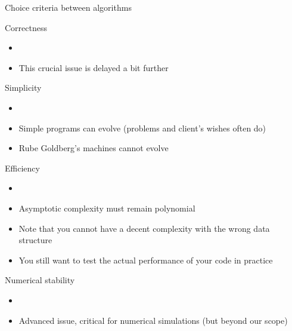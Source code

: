 \begin{frame}[squeeze]{Choice criteria between algorithms}
  \begin{block}{\alert{Correctness}}
    \begin{itemize}
    \item {}
    \item This crucial issue is delayed a bit further
    \end{itemize}
  \end{block}\vspace{-.6\baselineskip}
  \begin{block}{\alert{Simplicity}}
    \begin{itemize}
    \item {}
    \item Simple programs can evolve (problems and client's wishes often do)
    \item Rube Goldberg's machines cannot evolve
    \end{itemize}
  \end{block}\vspace{-.6\baselineskip}
  \begin{block}{\alert{Efficiency}}
    \begin{itemize}
    \item {}
    \item Asymptotic complexity must remain polynomial
    \item Note that you cannot have a decent complexity with the wrong
      data structure
    \item You still want to test the actual performance of your code in practice
    \end{itemize}
  \end{block}\vspace{-.6\baselineskip}
  \begin{block}{Numerical stability}
    \begin{itemize}
    \item {}
    \item Advanced issue, critical for numerical simulations (but beyond our
      scope)
    \end{itemize}
  \end{block}
\end{frame}


